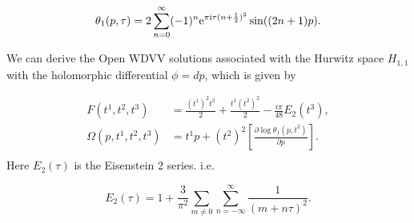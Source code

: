 \documentclass{article}
\theoremstyle{definition}
\begin{document}
\begin{equation*}
\theta_1(p,\tau)=2\sum_{n=0}^{\infty} (-1)^{n}{\rm e}^{\pi {\rm i}\tau(n+\frac{1}{2})^2 }\sin((2n+1)p).
\end{equation*}

We can derive the  Open WDVV solutions associated with the Hurwitz space  $H_{1,1}$ with the holomorphic differential $\phi=dp$, which is given by

 \begin{equation}\label{Open H11}
 \begin{split}
F\left(t^1,t^2,t^3\right)&=\frac{\left(t^1\right)^2t^3}{2}+\frac{t^1(t^2)^2}{2}-\frac{i\pi}{48}E_2(t^3),\\
\Omega(p,t^1,t^2,t^3)&=t^1p+(t^2)^2\left[\frac{\partial \log\theta_1(p,t^3)}{\partial p}\right].\\
\end{split}
\end{equation}
Here $E_2(\tau)$ is the Eisenstein 2 series. i.e.

\begin{equation*}
E_2(\tau)=1+\frac{3}{\pi^2}\sum_{m\neq 0}\sum_{n=-\infty}^{\infty}\frac{1}{(m+n\tau)^2}.
\end{equation*}

%
%
\end{document}
